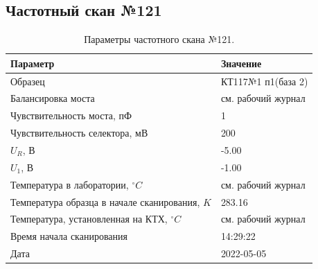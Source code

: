 \subsection{Частотный скан №121}
\begin{table}[!ht]
    \centering
    \caption{Параметры частотного скана №121.}
    \begin{tabular}{|l|l|}
        \hline
        Параметр                                       & Значение                  \\ \hline
        Образец                                        & КТ117№1 п1(база 2)        \\ \hline
        Балансировка моста                             & см. рабочий журнал        \\ \hline
        Чувствительность моста, пФ                     & 1                         \\ \hline
        Чувствительность селектора, мВ                 & 200                       \\ \hline
        $U_R$, В                                       & -5.00                     \\ \hline
        $U_1$, В                                       & -1.00                     \\ \hline
        Температура в лаборатории, $^\circ C$          & см. рабочий журнал        \\ \hline
        Температура образца в начале сканирования, $K$ & 283.16                    \\ \hline
        Температура, установленная на КТХ, $^\circ C$  & см. рабочий журнал        \\ \hline
        Время начала сканирования                      & 14:29:22                  \\ \hline
        Дата                                           & 2022-05-05                \\ \hline
    \end{tabular}
    \label{table:frequency_scan_121}
\end{table}

